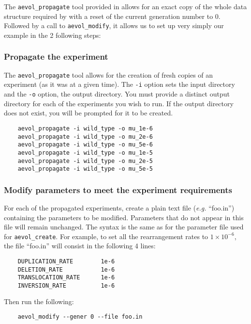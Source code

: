The \verb?aevol_propagate? tool provided in \aevol{} allows for an exact copy of the whole data structure required by \aevol{} with a reset of the current generation number to 0. Followed by a call to \verb?aevol_modify?, it allows us to set up very simply our example in the 2 following steps:


\subsubsection{Propagate the experiment}
The \verb?aevol_propagate? tool allows for the creation of fresh copies of an experiment (as it was at a given time). The \verb?-i? option sets the input directory and the \verb?-o? option, the output directory. You must provide a distinct output directory for each of the experiments you wish to run. If the output directory does not exist, you will be prompted for it to be created.
\begin{verbatim}
	aevol_propagate -i wild_type -o mu_1e-6
	aevol_propagate -i wild_type -o mu_2e-6
	aevol_propagate -i wild_type -o mu_5e-6
	aevol_propagate -i wild_type -o mu_1e-5
	aevol_propagate -i wild_type -o mu_2e-5
	aevol_propagate -i wild_type -o mu_5e-5
\end{verbatim}

\subsubsection{Modify parameters to meet the experiment requirements}
For each of the propagated experiments, create a plain text file (\emph{e.g.} ``foo.in'') containing the parameters to be modified. Parameters that do not appear in this file will remain unchanged. The syntax is the same as for the parameter file used for \verb?aevol_create?. For example, to set all the rearrangement rates to $1\times10^{-6}$, the file ``foo.in'' will consist in the following 4 lines:
\begin{verbatim}
    DUPLICATION_RATE        1e-6
    DELETION_RATE           1e-6
    TRANSLOCATION_RATE      1e-6
    INVERSION_RATE          1e-6
\end{verbatim}
Then run the following:
\begin{verbatim}
	aevol_modify --gener 0 --file foo.in
\end{verbatim}



